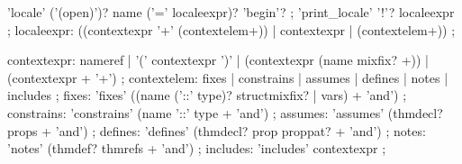 \begin{rail}
  'locale' ('(open)')? name ('=' localeexpr)? 'begin'?
  ;
  'print\_locale' '!'? localeexpr
  ;
  localeexpr: ((contextexpr '+' (contextelem+)) | contextexpr | (contextelem+))
  ;

  contextexpr: nameref | '(' contextexpr ')' |
  (contextexpr (name mixfix? +)) | (contextexpr + '+')
  ;
  contextelem: fixes | constrains | assumes | defines | notes | includes
  ;
  fixes: 'fixes' ((name ('::' type)? structmixfix? | vars) + 'and')
  ;
  constrains: 'constrains' (name '::' type + 'and')
  ;
  assumes: 'assumes' (thmdecl? props + 'and')
  ;
  defines: 'defines' (thmdecl? prop proppat? + 'and')
  ;
  notes: 'notes' (thmdef? thmrefs + 'and')
  ;
  includes: 'includes' contextexpr
  ;
\end{rail}

